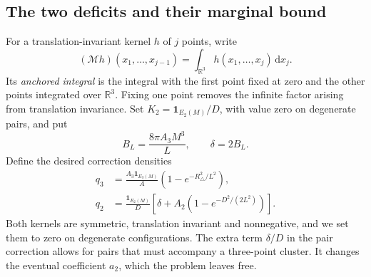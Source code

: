 \documentclass[11pt,a4paper]{article}
\numberwithin{equation}{section}
\theoremstyle{definition}
\theoremstyle{remark}
\newcommand{\R}{\mathbb R}
\newcommand{\ind}{\mathbf 1}
\newcommand{\dd}{\,\mathrm d}
\newcommand{\Mop}{\mathcal M}
\begin{document}
\subsection{The two deficits and their marginal bound}
\label{subsec:deficits}

For a translation-invariant kernel $h$ of $j$ points, write
\[
 (\Mop h)(x_1,\ldots,x_{j-1})
 =\int_{\R^3}h(x_1,\ldots,x_j)\dd x_j.
\]
Its \emph{anchored integral} is the integral with the first point fixed at
zero and the other points integrated over $\R^3$. Fixing one point removes
the infinite factor arising from translation invariance.
Set $K_2=\ind_{E_2(M)}/D$, with value zero on degenerate pairs, and put
\begin{equation}
 B_L=\frac{8\pi A_3M^3}{L},\qquad \delta=2B_L.
 \label{eq:BL}
\end{equation}
Define the desired correction densities
\begin{align}
 q_3&=\frac{A_3\ind_{E_3(M)}}{A}
                \left(1-e^{-R_\triangle^2/L^2}\right),\label{eq:q3}\\
 q_2&=\frac{\ind_{E_2(M)}}{D}
                \left[\delta+A_2\left(1-e^{-D^2/(2L^2)}\right)\right].
                \label{eq:q2}
\end{align}
Both kernels are symmetric, translation invariant and nonnegative, and
we set them to zero on degenerate configurations. The extra term
$\delta/D$ in the pair correction allows for pairs that must accompany a
three-point cluster. It changes the eventual coefficient $a_2$, which the
problem leaves free.
\end{document}
